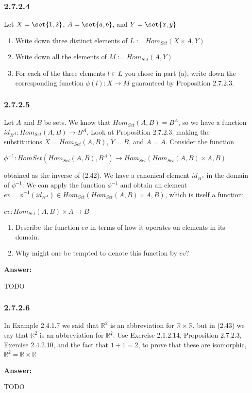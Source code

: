 \documentclass{article}
\newcommand{\Rational}{\mathbb{R}}
\newcommand{\vsp}[0]{\vspace*{10pt}\par}
\newcommand{\exercise}[1]{\subsubsection*{#1}}
\newcommand{\ans}[0]{\vsp\textbf{Answer: }\vsp}
\newcommand{\ei}{\item}
\newcommand{\eb}{\begin{enumerate}[label=(\alph*)]\ei}
\newcommand{\ee}{\end{enumerate}}
\begin{document}
\exercise{2.7.2.4}

Let $X = \set{1, 2}$, $A = \set{a, b}$, and $Y = \set{x, y}$

\eb Write down three distinct elements of $L := Hom_{Set}(X \times A, Y)$
\ei Write down all the elements of $M := Hom_{Set}(A, Y)$
\ei For each of the three elements $l \in L$ you chose in part (a), write down
    the corresponding function $\phi(l): X \to M$ guaranteed by Proposition
    2.7.2.3.
\ee


\exercise{2.7.2.5}

Let $A$ and $B$ be sets.  We know that $Hom_{Set}(A, B) = B^A$, so we have a
function $id_{B^A} : Hom_{Set}(A, B) \to B^A$. Look at Proposition 2.7.2.3,
making the substitutions $X = Hom_{Set}(A, B)$, $Y = B$, and $A = A$. Consider
the function

\vsp

$\phi^{-1} : Hom{Set}(Hom_{Set}(A, B), B^A) \to Hom_{Set}(Hom_{Set}(A, B) \times A, B)$

\vsp

obtained as the inverse of (2.42).  We have a canonical element $id_{B^A}$ in
the domain of $\phi^{-1}$.  We can apply the function $\phi^{-1}$ and obtain an
element $ev = \phi^{-1}(id_{B^A}) \in Hom_{Set}(Hom_{Set}(A, B) \times A, B)$,
which is itself a function:

\vsp
$ev: Hom_{Set}(A, B) \times A \to B$
\vsp

\eb Describe the function $ev$ in terms of how it operates on elements in its domain.
\ei Why might one be tempted to denote this function by $ev$?
\ee

\ans

TODO

\exercise{2.7.2.6}

In Example 2.4.1.7 we said that $\Rational^2$ is an abbreviation for $\Rational
\times \Rational$, but in (2.43) we say that $\Rational^2$ is an abbreviation
for $\Rational^{\underline{2}}$. Use Exercise 2.1.2.14, Proposition 2.7.2.3,
Exercise 2.4.2.10, and the fact that $1+1=2$, to prove that these are
isomorphic, $\Rational^2 = \Rational \times \Rational$

\ans

TODO

\vsp
\vsp
\vsp
\vsp

\printbibliography
\end{document}
